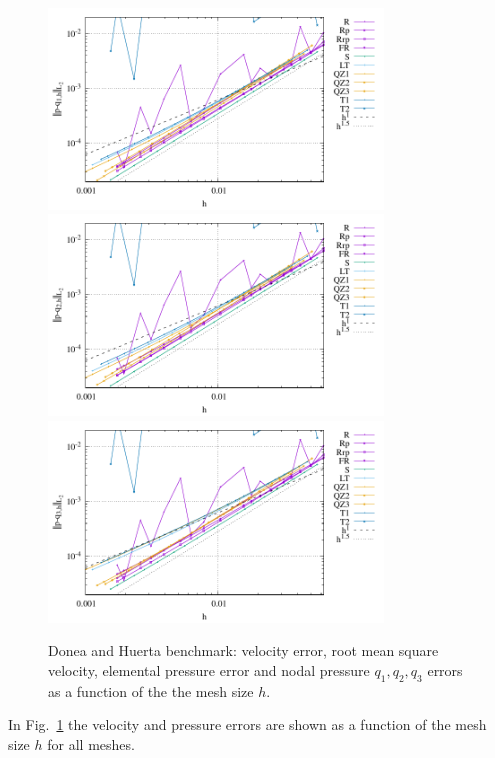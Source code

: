 \documentclass[a4paper,12pt]{article}
\begin{document}
\begin{figure}
\includegraphics[width=8.9cm]{../results/errors_q1_exp1}\\
\includegraphics[width=8.9cm]{../results/errors_q2_exp1}
\includegraphics[width=8.9cm]{../results/errors_q3_exp1}
\caption{Donea and Huerta benchmark: velocity error, 
root mean square velocity, elemental pressure error and nodal pressure $q_1,q_2,q_3$ errors 
as a function of the the mesh size $h$.} 
\label{fig:resdh}
\end{figure}

In Fig.~\ref{fig:resdh} the velocity and pressure errors are shown as a function of the 
mesh size $h$ for all meshes.
\end{document}
